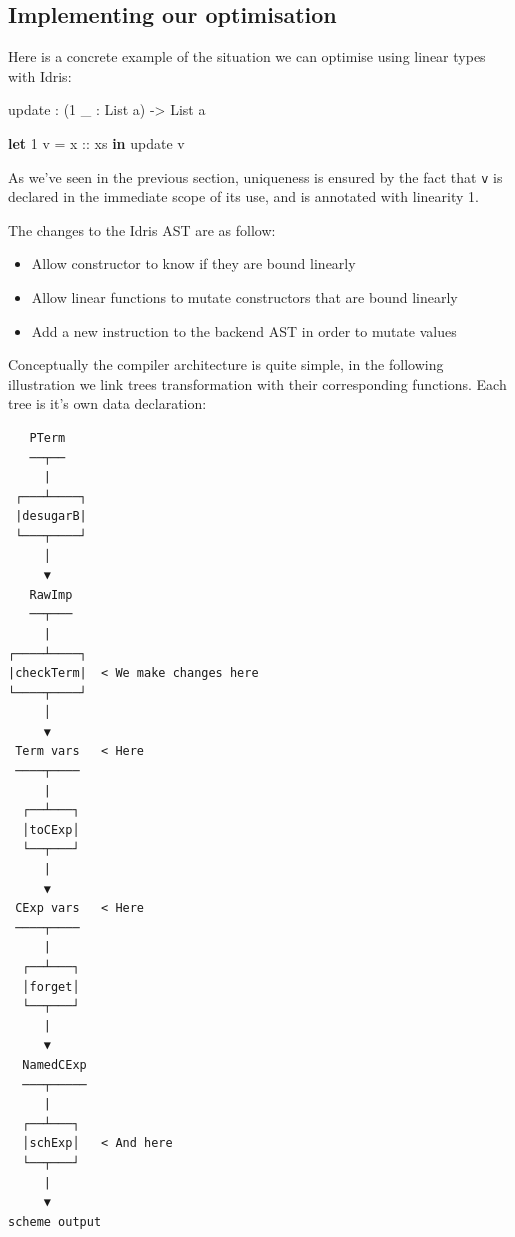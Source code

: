 \documentclass[
]{article}
\newenvironment{Shaded}{}{}
\newcommand{\DataTypeTok}[1]{\textcolor[rgb]{0.56,0.13,0.00}{#1}}
\newcommand{\DecValTok}[1]{\textcolor[rgb]{0.25,0.63,0.44}{#1}}
\newcommand{\KeywordTok}[1]{\textcolor[rgb]{0.00,0.44,0.13}{\textbf{#1}}}
\newcommand{\NormalTok}[1]{#1}
\newcommand{\OperatorTok}[1]{\textcolor[rgb]{0.40,0.40,0.40}{#1}}
\newcommand{\OtherTok}[1]{\textcolor[rgb]{0.00,0.44,0.13}{#1}}
\providecommand{\tightlist}{%
  \setlength{\itemsep}{0pt}\setlength{\parskip}{0pt}}
\begin{document}
\hypertarget{implementing-our-optimisation}{%
\subsection{Implementing our
optimisation}\label{implementing-our-optimisation}}

Here is a concrete example of the situation we can optimise using linear
types with Idris:

\begin{Shaded}
\begin{Highlighting}[]
\NormalTok{update }\OperatorTok{:}\NormalTok{ (}\DecValTok{1}\NormalTok{ \_ }\OperatorTok{:} \DataTypeTok{List}\NormalTok{ a) }\OtherTok{{-}\textgreater{}} \DataTypeTok{List}\NormalTok{ a}

\KeywordTok{let} \DecValTok{1}\NormalTok{ v }\OtherTok{= x ::}\NormalTok{ xs }\KeywordTok{in}
\NormalTok{    update v}
\end{Highlighting}
\end{Shaded}

As we've seen in the previous section, uniqueness is ensured by the fact
that \texttt{v} is declared in the immediate scope of its use, and is
annotated with linearity 1.

The changes to the Idris AST are as follow:

\begin{itemize}
\tightlist
\item
  Allow constructor to know if they are bound linearly
\item
  Allow linear functions to mutate constructors that are bound linearly
\item
  Add a new instruction to the backend AST in order to mutate values
\end{itemize}

Conceptually the compiler architecture is quite simple, in the following
illustration we link trees transformation with their corresponding
functions. Each tree is it's own data declaration:

\newpage

\begin{verbatim}
   PTerm
   ──┬──
     |
 ┌───┴────┐
 |desugarB|
 └───┬────┘
     │
     ▼
   RawImp
   ──┬───
     |
┌────┴────┐
|checkTerm|  < We make changes here
└────┬────┘
     │
     ▼
 Term vars   < Here
 ────┬────
     |
  ┌──┴───┐
  │toCExp│
  └──┬───┘
     |
     ▼
 CExp vars   < Here
 ────┬────
     |
  ┌──┴───┐
  │forget│
  └──┬───┘
     |
     ▼
  NamedCExp
  ───┬─────
     |
  ┌──┴───┐
  │schExp│   < And here
  └──┬───┘
     |
     ▼
scheme output
\end{verbatim}
\end{document}
